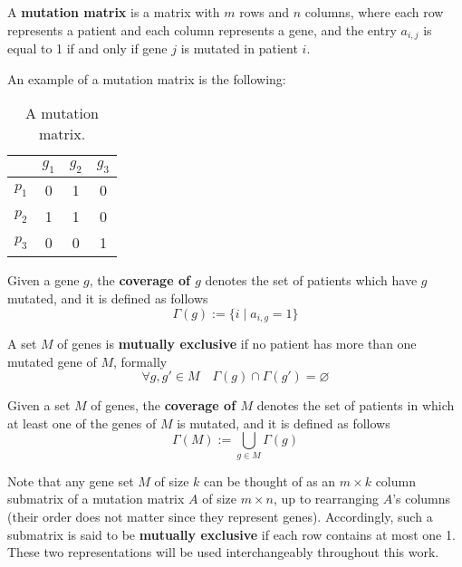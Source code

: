 \begin{definition} \label{mut_matrix_def}
    A \textbf{mutation matrix} is a matrix with $m$ rows and $n$ columns, where each row represents a patient and each column represents a gene, and the entry $a_{i, j}$ is equal to 1 if and only if gene $j$ is mutated in patient $i$.
\end{definition}

\begin{example} \label{mutation_matrix}
    An example of a mutation matrix is the following:

    \begin{table}[H]
        \centering
        \begin{tabular}{c|ccc}
                  & $g_1$ & $g_2$ & $g_3$ \\
            \hline
            $p_1$ & 0 & 1 & 0 \\
            $p_2$ & 1 & 1 & 0 \\
            $p_3$ & 0 & 0 & 1 \\
        \end{tabular}
        \caption{A mutation matrix.}
    \end{table}
\end{example}

\begin{definition}
    Given a gene $g$, the \textbf{coverage of $g$} denotes the set of patients which have $g$ mutated, and it is defined as follows $$\Gamma(g) := \{i \mid a_{i, g} = 1\}$$ 
\end{definition}

\begin{definition} \label{mut_ex_first}
    A set $M$ of genes is \textbf{mutually exclusive} if no patient has more than one mutated gene of $M$, formally $$\forall g, g' \in M \quad \Gamma(g) \cap \Gamma(g') = \varnothing$$
\end{definition}

\begin{definition}
    Given a set $M$ of genes, the \textbf{coverage of $M$} denotes the set of patients in which at least one of the genes of $M$ is mutated, and it is defined as follows $$\Gamma(M) := \bigcup_{g \in M}{\Gamma(g)}$$
\end{definition}

Note that any gene set $M$ of size $k$ can be thought of as an $m \times k$ column submatrix of a mutation matrix $A$ of size $m \times n$, up to rearranging $A$'s columns (their order does not matter since they represent genes). Accordingly, such a submatrix is said to be \textbf{mutually exclusive} if each row contains at most one 1. These two representations will be used interchangeably throughout this work.

